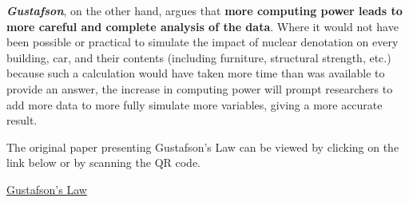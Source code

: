 \textbf{\emph{Gustafson}}, on the other hand, argues that \textbf{more computing power leads to more careful and complete analysis of the data}. Where it would not have been possible or practical to simulate the impact of nuclear denotation on every building, car, and their contents (including furniture, structural strength, etc.) because such a calculation would have taken more time than was available to provide an answer, the increase in computing power will prompt researchers to add more data to more fully simulate more variables, giving a more accurate result.

\highspace
The original paper presenting Gustafson's Law\cite{gustafson1988reevaluating} can be viewed by clicking on the link below or by scanning the QR code.
\begin{center}
    \href{https://dl.acm.org/doi/abs/10.1145/42411.42415}{Gustafson's Law}
    \hspace{2em}
\end{center}